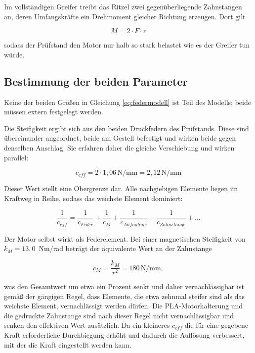 Im vollständigen Greifer treibt das Ritzel zwei gegenüberliegende Zahnstangen an, deren
Umfangskräfte ein Drehmoment gleicher Richtung erzeugen. Dort gilt

\begin{equation}
    M = 2 \cdot F \cdot r
    \label{eq:moment_greifer}
\end{equation}

sodass der Prüfstand den Motor nur halb so stark belastet wie es der Greifer
tun würde.

\subsection*{Bestimmung der beiden Parameter}

Keine der beiden Größen in Gleichung \ref{eq:federmodell} ist Teil des Modells; beide müssen
extern festgelegt werden.

Die Steifigkeit ergibt sich aus den beiden Druckfedern des Prüfstands. Diese sind
übereinander angeordnet, beide am Gestell befestigt und wirken beide gegen denselben
Anschlag. Sie erfahren daher die gleiche Verschiebung und wirken parallel:

\begin{equation}
    c_{eff} = 2 \cdot 1,06\,\mathrm{N/mm} = 2,12\,\mathrm{N/mm}
    \label{eq:steifigkeit}
\end{equation}

Dieser Wert stellt eine Obergrenze dar. Alle nachgiebigen Elemente liegen im Kraftweg
in Reihe, sodass das weichste Element dominiert:

\begin{equation}
    \frac{1}{c_{eff}}
    = \frac{1}{c_{Feder}} + \frac{1}{c_{M}} + \frac{1}{c_{Aufnahme}}
      + \frac{1}{c_{Zahnstange}} + \dots
    \label{eq:reihenschaltung}
\end{equation}

Der Motor selbst wirkt als Federelement. Bei einer magnetischen Steifigkeit von
$k_M = 13,0$~Nm/rad beträgt der äquivalente Wert an der Zahnstange

\begin{equation}
    c_{M} = \frac{k_M}{r^2} = 180\,\mathrm{N/mm} ,
    \label{eq:motorsteifigkeit}
\end{equation}

was den Gesamtwert um etwa ein Prozent senkt und daher vernachlässigbar ist
gemäß der gängigen Regel, dass Elemente, die etwa zehnmal steifer sind als das weichste
Element, vernachlässigt werden dürfen. Die PLA-Motorhalterung und die gedruckte Zahnstange sind
nach dieser Regel nicht vernachlässigbar und senken den effektiven Wert zusätzlich. Da ein
kleineres $c_{eff}$ die für eine gegebene Kraft erforderliche Durchbiegung erhöht und dadurch
die Auflösung verbessert, mit der die Kraft eingestellt werden kann.

